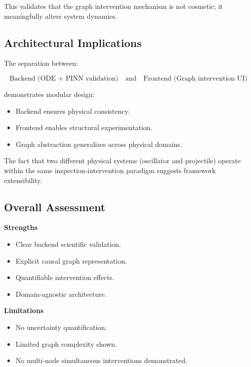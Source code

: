 \documentclass[12pt,singleside,a4paper]{article}
\begin{document}
This validates that the graph intervention mechanism is not cosmetic; it meaningfully alters system dynamics.

\subsection{Architectural Implications}

The separation between:

\[
\text{Backend (ODE + PINN validation)} 
\quad \text{and} \quad
\text{Frontend (Graph intervention UI)}
\]

demonstrates modular design:

\begin{itemize}
    \item Backend ensures physical consistency.
    \item Frontend enables structural experimentation.
    \item Graph abstraction generalizes across physical domains.
\end{itemize}

The fact that two different physical systems (oscillator and projectile) operate within the same inspection-intervention paradigm suggests framework extensibility.

\subsection{Overall Assessment}

\textbf{Strengths}
\begin{itemize}
    \item Clear backend scientific validation.
    \item Explicit causal graph representation.
    \item Quantifiable intervention effects.
    \item Domain-agnostic architecture.
\end{itemize}

\textbf{Limitations}
\begin{itemize}
    \item No uncertainty quantification.
    \item Limited graph complexity shown.
    \item No multi-node simultaneous interventions demonstrated.
\end{itemize}
\end{document}
